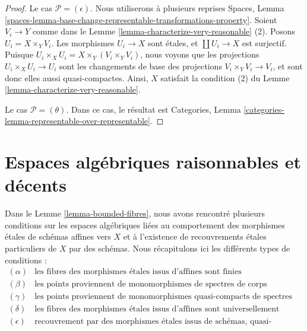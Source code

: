\begin{proof}
\medskip\noindent
Le cas $\mathcal{P} = (\epsilon)$. Nous utiliserons à plusieurs reprises
Spaces, Lemma
\ref{spaces-lemma-base-change-representable-transformations-property}.
Soient $V_i \to Y$ comme dans le
Lemme \ref{lemma-characterize-very-reasonable} (2).
Posons $U_i = X \times_Y V_i$. Les morphismes $U_i \to X$ sont étales,
et $\coprod U_i \to X$ est surjectif. Puisque
$U_i \times_X U_i = X \times_Y (V_i \times_Y V_i)$, nous voyons que les
projections $U_i \times_X U_i \to U_i$ sont les changements de base des
projections $V_i \times_Y V_i \to V_i$, et sont donc elles aussi
quasi-compactes. Ainsi, $X$ satisfait la condition (2) du
Lemme \ref{lemma-characterize-very-reasonable}.

\medskip\noindent
Le cas $\mathcal{P} = (\theta)$. Dans ce cas, le résultat est
Categories, Lemma \ref{categories-lemma-representable-over-representable}.
\end{proof}











\section{Espaces algébriques raisonnables et décents}
\label{section-reasonable-decent}

\noindent
Dans le
Lemme \ref{lemma-bounded-fibres},
nous avons rencontré plusieurs conditions sur les espaces algébriques liées
au comportement des morphismes étales de schémas affines vers $X$
et à l'existence de recouvrements étales particuliers de $X$ par des
schémas. Nous récapitulons ici les différents types de conditions :
$$
\boxed{
\begin{matrix}
(\alpha) & \text{les fibres des morphismes étales issus d'affines
sont finies} \\
(\beta) & \text{les points proviennent de monomorphismes
de spectres de corps} \\
(\gamma) & \text{les points proviennent de monomorphismes quasi-compacts de
spectres de corps} \\
(\delta) & \text{les fibres des morphismes étales issus d'affines sont
universellement bornées} \\
(\epsilon) & \text{recouvrement par des morphismes étales issus de schémas,
quasi-compacts sur leur image}
\end{matrix}
}
$$

